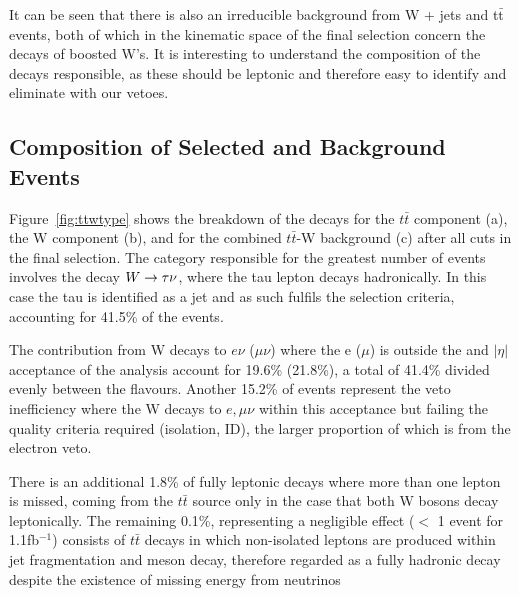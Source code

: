 It can be seen that there is also an irreducible background from W + jets and t$\bar{\textrm{t}}$ events, both of which in the kinematic space of the final selection concern the decays of boosted W's. It is interesting to understand the composition of the decays responsible, as these should be leptonic and therefore easy to identify and eliminate with our vetoes.

\subsection{Composition of Selected \ttj and \wj Background Events}
\label{sec:ttwcomp}
Figure~\ref{fig:ttwtype} shows the breakdown of the decays for the $t\bar{t}$ component (a), the W component (b), and for the combined $t\bar{t}$-W background (c) after all cuts in the final selection. The category responsible for the greatest number of events involves the decay $W \rightarrow \tau \nu$, where the tau lepton decays hadronically. In this case the tau is identified as a jet and as such fulfils the selection criteria, accounting for 41.5\% of the events.

The contribution from W decays to $e \nu$ ($\mu \nu$) where the e ($\mu$) is outside the \Pt and $|\eta|$ acceptance of the analysis account for 19.6\% (21.8\%), a total of 41.4\% divided evenly between the flavours. Another 15.2\% of events represent the veto inefficiency where the W decays to $e, \mu \nu$ within this acceptance but failing the quality criteria required (isolation, ID), the larger proportion of which is from the electron veto. 

There is an additional 1.8\% of fully leptonic decays where more than one lepton is missed, coming from the $t\bar{t}$ source only in the case that both W bosons decay leptonically. The remaining 0.1\%, representing a negligible effect ($<$ 1 event for 1.1fb$^{-1}$) consists of $t\bar{t}$ decays in which non-isolated leptons are produced within jet fragmentation and meson decay, therefore regarded as a fully hadronic decay despite the existence of missing energy from neutrinos


